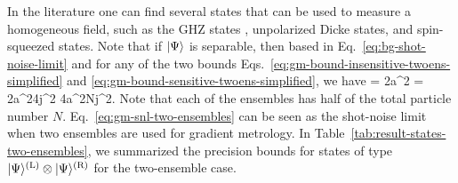 In the literature one can find several states that can be used to measure a homogeneous field, such as the GHZ states \cite{Greenberger1989}, unpolarized Dicke states, and spin-squeezed states.
Note that if $\vert{\Psi}\rangle$ is separable, then based in Eq.~\eqref{eq:bg-shot-noise-limit} and for any of the two bounds Eqs.~\eqref{eq:gm-bound-insensitive-twoens-simplified} and \eqref{eq:gm-bound-sensitive-twoens-simplified}, we have
\be
  = 2a^2
  = 2a^24j^2
  \leqslant 4a^2Nj^2.
  \label{eq:gm-snl-two-ensembles}
\ee
Note that each of the ensembles has half of the total particle number $N$.
Eq.~\eqref{eq:gm-snl-two-ensembles} can be seen as the shot-noise limit when two ensembles are used for gradient metrology.
In Table~\ref{tab:result-states-two-ensembles}, we summarized the precision bounds for states of type $\vert{\Psi}\rangle^{(\text{L})}\otimes \vert{\Psi}\rangle^{(\text{R})}$ for the two-ensemble case.
